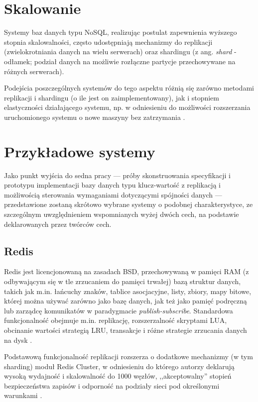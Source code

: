 \section{Skalowanie}

Systemy baz danych typu NoSQL, realizując postulat zapewnienia wyższego stopnia skalowalności, często udostępniają mechanizmy do replikacji (zwielokrotniania danych na wielu serwerach) oraz shardingu (z ang. \textit{shard} - odłamek; podział danych na możliwie rozłączne partycje przechowywane na różnych serwerach).

Podejścia poszczególnych systemów do tego aspektu różnią się zarówno metodami replikacji i shardingu (o ile jest on zaimplementowany), jak i stopniem elastyczności działającego systemu, np. w odniesieniu do możliwości rozszerzania uruchomionego systemu o nowe maszyny bez zatrzymania \cite{ell09a}.

\section{Przykładowe systemy}

Jako punkt wyjścia do sedna pracy --- próby skonstruowania specyfikacji i prototypu implementacji bazy danych typu klucz-wartość z replikacją i możliwością sterowania wymaganiami dotyczącymi spójności danych --- przedstawione zostaną skrótowo wybrane systemy o podobnej charakterystyce, ze szczególnym uwzględnieniem wspomnianych wyżej dwóch cech, na podstawie deklarowanych przez twórców cech.

\subsection{Redis}

Redis jest licencjonowaną na zasadach BSD, przechowywaną w pamięci RAM (z odbywającym się w tle zrzucaniem do pamięci trwałej) bazą struktur danych, takich jak m.in. łańcuchy znaków, tablice asocjacyjne, listy, zbiory, mapy bitowe, której można używać zarówno jako bazę danych, jak też jako pamięć podręczną lub zarządcę komunikatów w paradygmacie \textit{publish-subscribe}. Standardowa funkcjonalność obejmuje m.in. replikację, rozszerzalność skryptami LUA, obcinanie wartości strategią LRU, transakcje i różne strategie zrzucania danych na dysk \cite{redis}.

Podstawową funkcjonalność replikacji rozszerza o dodatkowe mechanizmy (w tym sharding) moduł Redis Cluster, w odniesieniu do którego autorzy deklarują wysoką wydajność i skalowalność do 1000 węzłów, ,,akceptowalny'' stopień bezpieczeństwa zapisów i odporność na podziały sieci pod określonymi warunkami \cite{rediscluster}.

